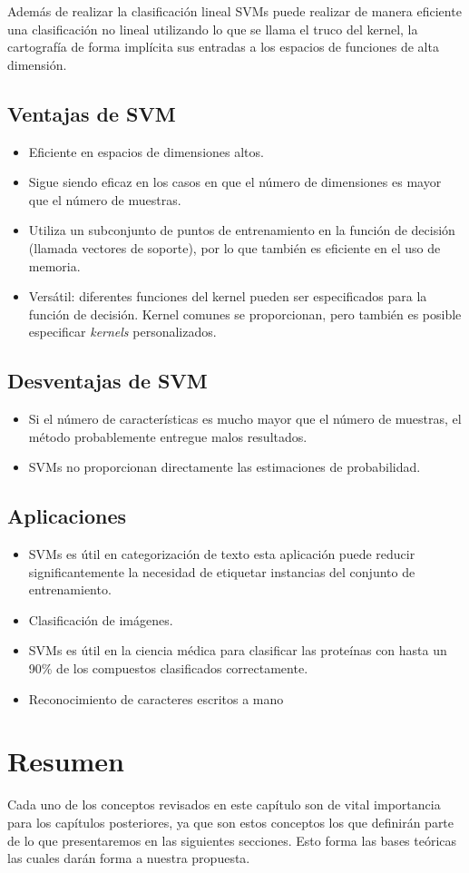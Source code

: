 Además de realizar la clasificación lineal SVMs puede realizar de manera eficiente una clasificación no lineal utilizando lo que se llama el truco del kernel, la cartografía de forma implícita sus entradas a los espacios de funciones de alta dimensión.

\subsection{Ventajas de SVM}
\begin{itemize}
\item Eficiente en espacios de dimensiones altos.
\item Sigue siendo eficaz en los casos en que el número de dimensiones es mayor que el número de muestras.
\item Utiliza un subconjunto de puntos de entrenamiento en la función de decisión (llamada vectores de soporte), por lo que también es eficiente en el uso de memoria.
\item Versátil: diferentes funciones del kernel pueden ser especificados para la función de decisión. Kernel comunes se proporcionan, pero también es posible especificar \textit{kernels} personalizados.
\end{itemize}

\subsection{Desventajas de SVM}
\begin{itemize}
\item Si el número de características es mucho mayor que el número de muestras, el método probablemente entregue malos resultados.
\item SVMs no proporcionan directamente las estimaciones de probabilidad.
\end{itemize}

\subsection{Aplicaciones}
\begin{itemize}
\item SVMs es útil en categorización de texto esta aplicación puede reducir significantemente la necesidad de etiquetar instancias del conjunto de entrenamiento.
\item Clasificación de imágenes. 
\item SVMs es útil en la ciencia médica para clasificar las proteínas con hasta un 90\% de los compuestos clasificados correctamente.
\item Reconocimiento de caracteres escritos a mano
\end{itemize}

\section{Resumen}\label{sec:resumen}

Cada uno de los conceptos revisados en este capítulo son de vital importancia para los capítulos posteriores, ya que son estos conceptos los que definirán parte de lo que presentaremos en las siguientes secciones. Esto forma las bases teóricas las cuales darán forma a nuestra propuesta.